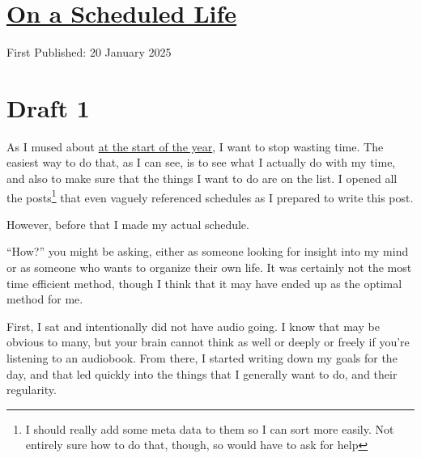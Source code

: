 \documentclass[12pt]{article}[titlepage]
\newcommand{\say}[1]{``#1''}
\renewcommand{\,}{\textsuperscript{,}}
\begin{document}
\doublespacing
\section{\href{scheduled-life.html}{On a Scheduled Life}}

First Published: 20 January 2025

\section{Draft 1}  
As I mused about \href{planning-2025}{at the start of the year}, I want to stop wasting time.  
The easiest way to do that, as I can see, is to see what I actually do with my time, and also to make sure that the things I want to do are on the list.  
I opened all the posts\footnote{I should really add some meta data to them so I can sort more easily. Not entirely sure how to do that, though, so would have to ask for help} that even vaguely referenced schedules as I prepared to write this post.

However, before that I made my actual schedule.

\say{How?} you might be asking, either as someone looking for insight into my mind or as someone who wants to organize their own life.  
It was certainly not the most time efficient method, though I think that it may have ended up as the optimal method for me.

First, I sat and intentionally did not have audio going.  
I know that may be obvious to many, but your brain cannot think as well or deeply or freely if you're listening to an audiobook.  
From there, I started writing down my goals for the day, and that led quickly into the things that I generally want to do, and their regularity.
\end{document}
